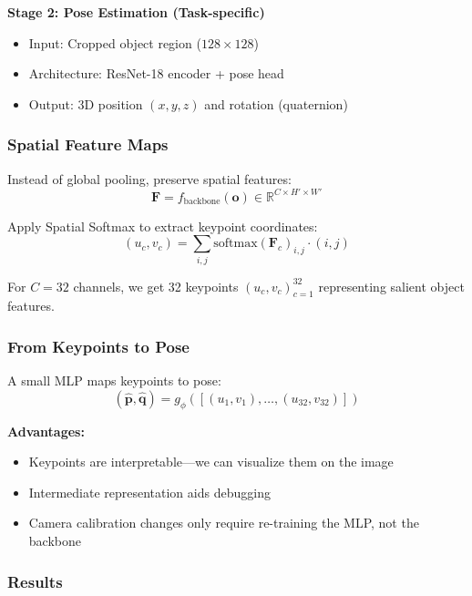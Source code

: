 \textbf{Stage 2: Pose Estimation (Task-specific)}
\begin{itemize}
    \item Input: Cropped object region ($128 \times 128$)
    \item Architecture: ResNet-18 encoder + pose head
    \item Output: 3D position $(x, y, z)$ and rotation (quaternion)
\end{itemize}

\subsubsection{Spatial Feature Maps}

Instead of global pooling, preserve spatial features:
\begin{equation}
\mathbf{F} = f_{\text{backbone}}(\mathbf{o}) \in \mathbb{R}^{C \times H' \times W'}
\label{eq:spatial_features}
\end{equation}

Apply Spatial Softmax to extract keypoint coordinates:
\begin{equation}
(u_c, v_c) = \sum_{i,j} \text{softmax}(\mathbf{F}_c)_{i,j} \cdot (i, j)
\label{eq:keypoint_extraction}
\end{equation}

For $C = 32$ channels, we get 32 keypoints $(u_c, v_c)_{c=1}^{32}$ representing salient object features.

\subsubsection{From Keypoints to Pose}

A small MLP maps keypoints to pose:
\begin{equation}
(\hat{\mathbf{p}}, \hat{\mathbf{q}}) = g_\phi([(u_1, v_1), \ldots, (u_{32}, v_{32})])
\label{eq:keypoint_to_pose}
\end{equation}

\textbf{Advantages:}
\begin{itemize}
    \item Keypoints are interpretable---we can visualize them on the image
    \item Intermediate representation aids debugging
    \item Camera calibration changes only require re-training the MLP, not the backbone
\end{itemize}

\subsubsection{Results}

